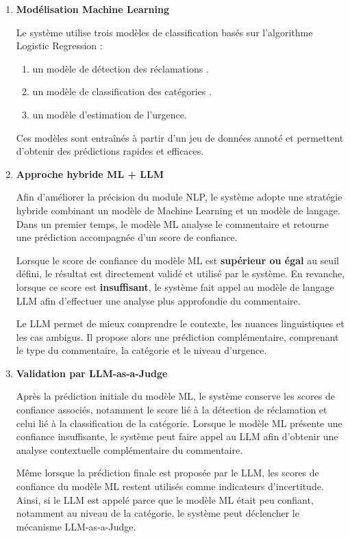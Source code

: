 \documentclass[12pt,a4paper,oneside]{report}
\begin{document}
\begin{itemize}
\begin{enumerate}
    \item \textbf{Modélisation Machine Learning}

Le système utilise trois modèles de classification basés sur l’algorithme Logistic Regression \cite{logreg} :

\begin{enumerate}
    \item un modèle de détection des réclamations .
    \item un modèle de classification des catégories .
    \item un modèle d’estimation de l’urgence.
\end{enumerate}

Ces modèles sont entraînés à partir d’un jeu de données annoté et permettent d’obtenir des prédictions rapides et efficaces.

    \item \textbf{Approche hybride ML + LLM} 

Afin d’améliorer la précision du module NLP, le système adopte une stratégie hybride combinant un modèle de Machine Learning et un modèle de langage. Dans un premier temps, le modèle ML analyse le commentaire et retourne une prédiction accompagnée d’un score de confiance.

Lorsque le score de confiance du modèle ML est \textbf{supérieur ou égal} au seuil défini, le résultat est directement validé et utilisé par le système. En revanche, lorsque ce score est \textbf{insuffisant}, le système fait appel au modèle de langage LLM afin d’effectuer une analyse plus approfondie du commentaire.

Le LLM permet de mieux comprendre le contexte, les nuances linguistiques et les cas ambigus. Il propose alors une prédiction complémentaire, comprenant le type du commentaire, la catégorie et le niveau d’urgence.


    \item \textbf{Validation par LLM-as-a-Judge}

Après la prédiction initiale du modèle ML, le système conserve les scores de confiance associés, notamment le score lié à la détection de réclamation et celui lié à la classification de la catégorie. Lorsque le modèle ML présente une confiance insuffisante, le système peut faire appel au LLM afin d’obtenir une analyse contextuelle complémentaire du commentaire.

Même lorsque la prédiction finale est proposée par le LLM, les scores de confiance du modèle ML restent utilisés comme indicateurs d’incertitude. Ainsi, si le LLM est appelé parce que le modèle ML était peu confiant, notamment au niveau de la catégorie, le système peut déclencher le mécanisme LLM-as-a-Judge.


\end{enumerate}
\end{itemize}
\end{document}
